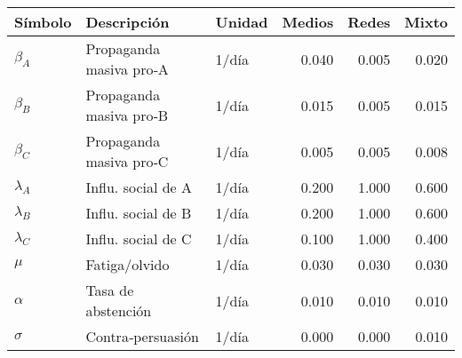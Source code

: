 \begin{tabular}{lllrrr}
\toprule
    Símbolo &             Descripción & Unidad &  Medios &  Redes &  Mixto \\
\midrule
  $\beta_A$ & Propaganda masiva pro‑A &  1/día &   0.040 &  0.005 &  0.020 \\
  $\beta_B$ & Propaganda masiva pro‑B &  1/día &   0.015 &  0.005 &  0.015 \\
  $\beta_C$ & Propaganda masiva pro‑C &  1/día &   0.005 &  0.005 &  0.008 \\
$\lambda_A$ &      Influ. social de A &  1/día &   0.200 &  1.000 &  0.600 \\
$\lambda_B$ &      Influ. social de B &  1/día &   0.200 &  1.000 &  0.600 \\
$\lambda_C$ &      Influ. social de C &  1/día &   0.100 &  1.000 &  0.400 \\
      $\mu$ &           Fatiga/olvido &  1/día &   0.030 &  0.030 &  0.030 \\
   $\alpha$ &      Tasa de abstención &  1/día &   0.010 &  0.010 &  0.010 \\
   $\sigma$ &       Contra‑persuasión &  1/día &   0.000 &  0.000 &  0.010 \\
\bottomrule
\end{tabular}
